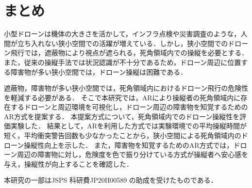 \documentclass[submit, sigrecommended]{ipsj}
\begin{document}
\section{まとめ}
\label{sec:Conclusion}
小型ドローンは機体の大きさを活かして，インフラ点検や災害調査のような，人間が立ち入れない狭小空間での活躍が増えている．しかし，狭小空間でのドローン飛行では，遮蔽物により視点が遮られる，死角領域内での操縦を必要とする．また，従来の操縦手法では状況認識が不十分であるため，ドローン周辺に位置する障害物が多い狭小空間では，ドローン操縦は困難である．\par
遮蔽物，障害物が多い狭小空間では，死角領域内におけるドローン飛行の危険性を軽減する必要がある．
そこで本研究では，ARにより操縦者の死角領域内に存在するドローンと周辺環境を可視化し，ドローン周辺の障害物を知覚するためのAR方式を提案する．
本提案方式について，死角領域内でのドローン操縦性を評価実験した．
結果として，ARを利用した方式では実験環境での平均操縦時間が短く，平均衝突警告回数も少なかったことから，狭小空間による死角領域内のドローン操縦性向上を示した．
また，障害物を知覚するためのAR方式では，ドローン周辺の障害物に対し，危険度を色で振り分けている方式が操縦者へ安心感を与え，操縦性が向上することを確認した．\\

\begin{acknowledgment}
  本研究の一部はJSPS 科研費JP20H00589 の助成を受けたものである．
\end{acknowledgment}




\begin{biography}
%
%
\end{biography}
\end{document}
